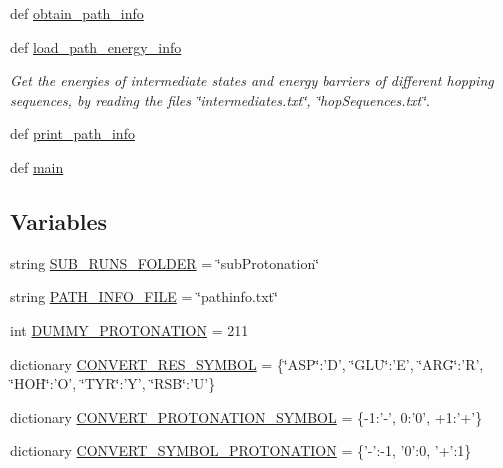 \begin{DoxyCompactItemize}
def \hyperlink{namespaceget__path__barrier_a29e6e678893430fe35ac2770d33d8fca}{obtain\-\_\-path\-\_\-info}
\item 
def \hyperlink{namespaceget__path__barrier_ac3f094337440db8ab7f469aa0d094e45}{load\-\_\-path\-\_\-energy\-\_\-info}
\begin{DoxyCompactList}\small\item\em Get the energies of intermediate states and energy barriers of different hopping sequences, by reading the files \char`\"{}intermediates.\-txt\char`\"{}, \char`\"{}hop\-Sequences.\-txt\char`\"{}. \end{DoxyCompactList}\item 
def \hyperlink{namespaceget__path__barrier_a2a43ab809275703fd660892cc98ff046}{print\-\_\-path\-\_\-info}
\item 
def \hyperlink{namespaceget__path__barrier_a574d6aa0b948491b84159b7eb992a565}{main}
\end{DoxyCompactItemize}
\subsection*{Variables}
\begin{DoxyCompactItemize}
\item 
string \hyperlink{namespaceget__path__barrier_aef5f1ad285a3196ab11fff9219204218}{S\-U\-B\-\_\-\-R\-U\-N\-S\-\_\-\-F\-O\-L\-D\-E\-R} = \char`\"{}sub\-Protonation\char`\"{}
\item 
string \hyperlink{namespaceget__path__barrier_a9289a40b9eeec17ceac379cac4a16068}{P\-A\-T\-H\-\_\-\-I\-N\-F\-O\-\_\-\-F\-I\-L\-E} = \char`\"{}pathinfo.\-txt\char`\"{}
\item 
int \hyperlink{namespaceget__path__barrier_a882c28e76d1deec3c781114b0f36f251}{D\-U\-M\-M\-Y\-\_\-\-P\-R\-O\-T\-O\-N\-A\-T\-I\-O\-N} = 211
\item 
dictionary \hyperlink{namespaceget__path__barrier_ab01c3f741d5264dc9d03f8842c5b0f41}{C\-O\-N\-V\-E\-R\-T\-\_\-\-R\-E\-S\-\_\-\-S\-Y\-M\-B\-O\-L} = \{\char`\"{}A\-S\-P\char`\"{}\-:'D', \char`\"{}G\-L\-U\char`\"{}\-:'E', \char`\"{}A\-R\-G\char`\"{}\-:'R', \char`\"{}H\-O\-H\char`\"{}\-:'O', \char`\"{}T\-Y\-R\char`\"{}\-:'Y', \char`\"{}R\-S\-B\char`\"{}\-:'U'\}
\item 
dictionary \hyperlink{namespaceget__path__barrier_abe0126328680c0cd5edd2bf73b071868}{C\-O\-N\-V\-E\-R\-T\-\_\-\-P\-R\-O\-T\-O\-N\-A\-T\-I\-O\-N\-\_\-\-S\-Y\-M\-B\-O\-L} = \{-\/1\-:'-\/', 0\-:'0', +1\-:'+'\}
\item 
dictionary \hyperlink{namespaceget__path__barrier_a4609e6e752b63ea89724bcdf53782e5c}{C\-O\-N\-V\-E\-R\-T\-\_\-\-S\-Y\-M\-B\-O\-L\-\_\-\-P\-R\-O\-T\-O\-N\-A\-T\-I\-O\-N} = \{'-\/'\-:-\/1, '0'\-:0, '+'\-:1\}
\end{DoxyCompactItemize}


